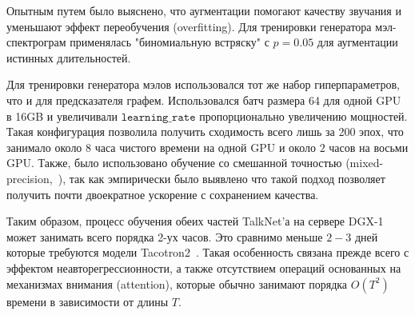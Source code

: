 Опытным путем было выяснено, что аугментации помогают качеству звучания и уменьшают эффект переобучения (overfitting). Для тренировки генератора мэл-спектрограм применялась "биномиальную встряску" с $p=0.05$ для аугментации истинных длительностей.

Для тренировки генератора мэлов использовался тот же набор гиперпараметров, что и для предсказателя графем. Использовался батч размера 64 для одной GPU в 16GB и увеличивали $\texttt{learning\_rate}$ пропорционально увеличению мощностей. Такая конфигурация позволила получить сходимость всего лишь за 200 эпох, что занимало около $8$ часа чистого времени на одной GPU и около $2$ часов на восьми GPU. Также, было использовано обучение со смешанной точностью (mixed-precision,~\cite{micikevicius}), так как эмпирически было выявлено что такой подход позволяет получить почти двоекратное ускорение с сохранением качества.

Таким образом, процесс обучения обеих частей TalkNet'а на сервере DGX-1 может занимать всего порядка 2-ух часов. Это сравнимо меньше $2-3$ дней которые требуются модели Tacotron2~\cite{tacotron2}. Такая особенность связана прежде всего с эффектом неавторегрессионности, а также отсутствием операций основанных на механизмах внимания (attention), которые обычно занимают порядка $O(T^2)$ времени в зависимости от длины $T$.